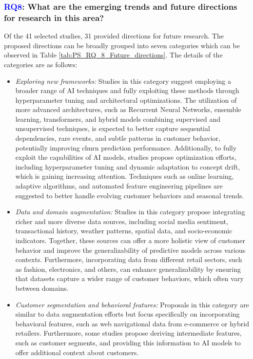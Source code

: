 \documentclass[preprint,12pt]{elsarticle}
\newcommand{\RQlabel}[1]{\textcolor{blue}{#1}}
\newcommand{\RSRQeight}{\RQlabel{RQ8}: What are the emerging trends and future directions for research in this area?}
\begin{document}
\subsubsection{\RSRQeight}
\label{sec:RQ8}
Of the 41 selected studies, 31 provided directions for future research. The proposed directions can be broadly grouped into seven categories which can be observed in Table \ref{tab:PS_RQ_8_Future_directions}. The details of the categories are as follows:

\begin{itemize}

    \item \textit{Exploring new frameworks:} Studies in this category suggest employing a broader range of AI techniques and fully exploiting these methods through hyperparameter tuning and architectural optimizations. The utilization of more advanced architectures, such as Recurrent Neural Networks, ensemble learning, transformers, and hybrid models combining supervised and unsupervised techniques, is expected to better capture sequential dependencies, rare events, and subtle patterns in customer behavior, potentially improving churn prediction performance. Additionally, to fully exploit the capabilities of AI models, studies propose optimization efforts, including hyperparameter tuning and dynamic adaptation to concept drift, which is gaining increasing attention. Techniques such as online learning, adaptive algorithms, and automated feature engineering pipelines are suggested to better handle evolving customer behaviors and seasonal trends.


    \item \textit{Data and domain augmentation:} Studies in this category propose integrating richer and more diverse data sources, including social media sentiment, transactional history, weather patterns, spatial data, and socio-economic indicators. Together, these sources can offer a more holistic view of customer behavior and improve the generalizability of predictive models across various contexts. Furthermore, incorporating data from different retail sectors, such as fashion, electronics, and others, can enhance generalizability by ensuring that datasets capture a wider range of customer behaviors, which often vary between domains.
    
    \item \textit{Customer segmentation and behavioral features:} Proposals in this category are similar to data augmentation efforts but focus specifically on incorporating behavioral features, such as web navigational data from e-commerce or hybrid retailers. Furthermore, some studies propose deriving intermediate features, such as customer segments, and providing this information to AI models to offer additional context about customers.
    

\end{itemize}
\end{document}
